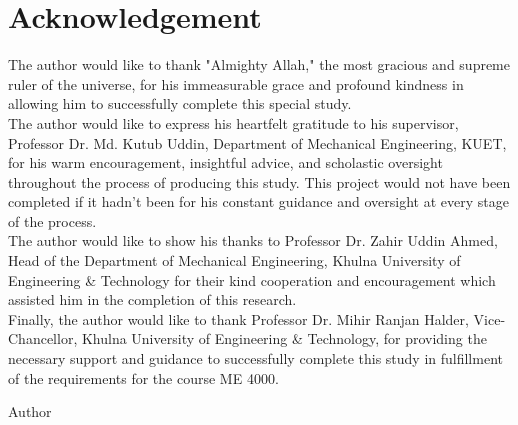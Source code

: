 \section*{\centering\fontsize{14}{16}\selectfont Acknowledgement}
\vspace{3\baselineskip}
\thispagestyle{plain}
\fontsize{12}{14}\selectfont %


The author would like to thank "Almighty Allah," the most gracious and supreme ruler of the universe, for his immeasurable grace and profound kindness in allowing him to successfully complete this special study.\\ 
The author would like to express his heartfelt gratitude to his supervisor, Professor Dr. Md. Kutub Uddin, Department of Mechanical Engineering, KUET, for his warm encouragement, insightful advice, and scholastic oversight throughout the process of producing this study. This project would not have been completed if it hadn't been for his constant guidance and oversight at every stage of the process.\\ The author would like to show his thanks to Professor Dr. Zahir Uddin Ahmed, Head of the Department of Mechanical Engineering, Khulna University of Engineering \& Technology for their kind cooperation and encouragement which assisted him in the completion of this research.\\
Finally, the author would like to thank Professor Dr. Mihir Ranjan Halder, Vice-Chancellor, Khulna University of Engineering \& Technology, for providing the necessary support and guidance to successfully complete this study in fulfillment of the requirements for the course ME 4000.\\
\vspace{1\baselineskip} %

\hfill Author %

\clearpage
